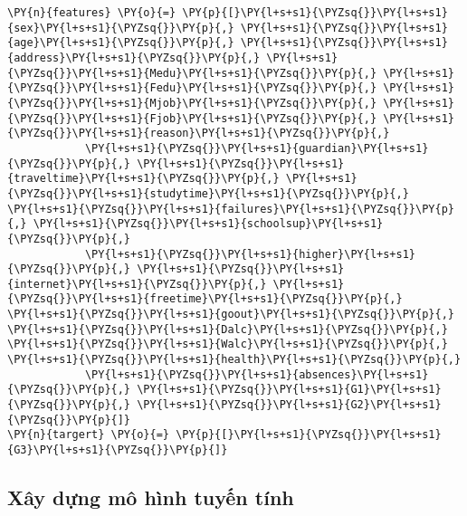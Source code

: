     \begin{tcolorbox}[breakable, size=fbox, boxrule=1pt, pad at break*=1mm,colback=cellbackground, colframe=cellborder]
\begin{Verbatim}[commandchars=\\\{\}]
\PY{n}{features} \PY{o}{=} \PY{p}{[}\PY{l+s+s1}{\PYZsq{}}\PY{l+s+s1}{sex}\PY{l+s+s1}{\PYZsq{}}\PY{p}{,} \PY{l+s+s1}{\PYZsq{}}\PY{l+s+s1}{age}\PY{l+s+s1}{\PYZsq{}}\PY{p}{,} \PY{l+s+s1}{\PYZsq{}}\PY{l+s+s1}{address}\PY{l+s+s1}{\PYZsq{}}\PY{p}{,} \PY{l+s+s1}{\PYZsq{}}\PY{l+s+s1}{Medu}\PY{l+s+s1}{\PYZsq{}}\PY{p}{,} \PY{l+s+s1}{\PYZsq{}}\PY{l+s+s1}{Fedu}\PY{l+s+s1}{\PYZsq{}}\PY{p}{,} \PY{l+s+s1}{\PYZsq{}}\PY{l+s+s1}{Mjob}\PY{l+s+s1}{\PYZsq{}}\PY{p}{,} \PY{l+s+s1}{\PYZsq{}}\PY{l+s+s1}{Fjob}\PY{l+s+s1}{\PYZsq{}}\PY{p}{,} \PY{l+s+s1}{\PYZsq{}}\PY{l+s+s1}{reason}\PY{l+s+s1}{\PYZsq{}}\PY{p}{,}
            \PY{l+s+s1}{\PYZsq{}}\PY{l+s+s1}{guardian}\PY{l+s+s1}{\PYZsq{}}\PY{p}{,} \PY{l+s+s1}{\PYZsq{}}\PY{l+s+s1}{traveltime}\PY{l+s+s1}{\PYZsq{}}\PY{p}{,} \PY{l+s+s1}{\PYZsq{}}\PY{l+s+s1}{studytime}\PY{l+s+s1}{\PYZsq{}}\PY{p}{,} \PY{l+s+s1}{\PYZsq{}}\PY{l+s+s1}{failures}\PY{l+s+s1}{\PYZsq{}}\PY{p}{,} \PY{l+s+s1}{\PYZsq{}}\PY{l+s+s1}{schoolsup}\PY{l+s+s1}{\PYZsq{}}\PY{p}{,}
            \PY{l+s+s1}{\PYZsq{}}\PY{l+s+s1}{higher}\PY{l+s+s1}{\PYZsq{}}\PY{p}{,} \PY{l+s+s1}{\PYZsq{}}\PY{l+s+s1}{internet}\PY{l+s+s1}{\PYZsq{}}\PY{p}{,} \PY{l+s+s1}{\PYZsq{}}\PY{l+s+s1}{freetime}\PY{l+s+s1}{\PYZsq{}}\PY{p}{,} \PY{l+s+s1}{\PYZsq{}}\PY{l+s+s1}{goout}\PY{l+s+s1}{\PYZsq{}}\PY{p}{,} \PY{l+s+s1}{\PYZsq{}}\PY{l+s+s1}{Dalc}\PY{l+s+s1}{\PYZsq{}}\PY{p}{,} \PY{l+s+s1}{\PYZsq{}}\PY{l+s+s1}{Walc}\PY{l+s+s1}{\PYZsq{}}\PY{p}{,} \PY{l+s+s1}{\PYZsq{}}\PY{l+s+s1}{health}\PY{l+s+s1}{\PYZsq{}}\PY{p}{,}
            \PY{l+s+s1}{\PYZsq{}}\PY{l+s+s1}{absences}\PY{l+s+s1}{\PYZsq{}}\PY{p}{,} \PY{l+s+s1}{\PYZsq{}}\PY{l+s+s1}{G1}\PY{l+s+s1}{\PYZsq{}}\PY{p}{,} \PY{l+s+s1}{\PYZsq{}}\PY{l+s+s1}{G2}\PY{l+s+s1}{\PYZsq{}}\PY{p}{]}
\PY{n}{targert} \PY{o}{=} \PY{p}{[}\PY{l+s+s1}{\PYZsq{}}\PY{l+s+s1}{G3}\PY{l+s+s1}{\PYZsq{}}\PY{p}{]}
\end{Verbatim}
\end{tcolorbox}

    \hypertarget{xuxe2y-dux1ef1ng-muxf4-huxecnh-tuyux1ebfn-tuxednh}{%
\subsection{Xây dựng mô hình tuyến
tính}\label{xuxe2y-dux1ef1ng-muxf4-huxecnh-tuyux1ebfn-tuxednh}}


